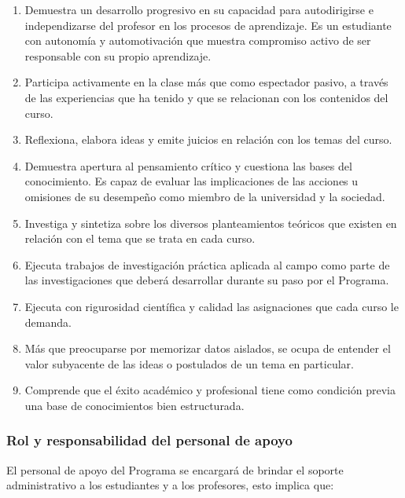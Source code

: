 \begin{enumerate}
\item Demuestra un desarrollo progresivo en su capacidad para autodirigirse e independizarse del profesor en los procesos de aprendizaje. Es un estudiante con autonomía y automotivación que muestra compromiso activo de ser responsable con su propio aprendizaje.
\item Participa activamente en la clase más que como espectador pasivo, a través de las experiencias que ha tenido y que se relacionan con los contenidos del curso.
\item Reflexiona, elabora ideas y emite juicios en relación con los temas del curso.
\item Demuestra apertura al pensamiento crítico y cuestiona las bases del conocimiento. Es capaz de evaluar las implicaciones de las acciones u omisiones de su desempeño como miembro de la universidad y la sociedad.
\item Investiga y sintetiza sobre los diversos planteamientos teóricos que existen en relación con el tema que se trata en cada curso.
\item Ejecuta trabajos de investigación práctica aplicada al campo como parte de las investigaciones que deberá desarrollar durante su paso por el Programa.
\item Ejecuta con rigurosidad científica y calidad las asignaciones que cada curso le demanda.
\item Más que preocuparse por memorizar datos aislados, se ocupa de entender el valor subyacente de las ideas o postulados de un tema en particular.
\item Comprende que el éxito académico y profesional tiene como condición previa una base de conocimientos bien estructurada.
\end{enumerate}
\subsubsection*{Rol y responsabilidad del personal de apoyo}

El personal de apoyo del Programa se encargará de brindar el soporte administrativo a los estudiantes y a los profesores, esto implica que:\par

